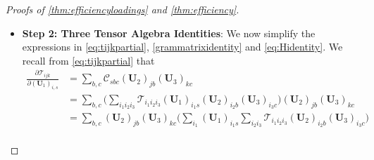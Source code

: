 \documentclass[10pt]{article}
\newcommand{\0}{{\mathbf{0}}}
\newcommand{\1}{{\mathbf{1}}}
\newcommand{\U}{{\mathbf{U}}}
\renewcommand{\t}{^{\top}}
\newcommand{\del}{\partial}
\begin{document}
\begin{proof}[Proofs of \cref{thm:efficiencyloadings} and \cref{thm:efficiency}]
\begin{itemize}
Define the $r_1$ vectors $\{\mathbf{c}_{a_i}\}_{i=1}^{r_1} \in \mathbb{R}^{r_2 r_3}$ by setting its $(b,c)$ entry equal to $\mathcal{C}_{a_i bc}$, and define the $r_2$ and $r_3$ vectors $\{\mathbf{c}_{b_j}\}_{j=1}^{r_2}$ and $\{ \mathbf{c}_{c_k}\}_{k=1}^{r_3}$ similarly.  With this definition, we note that \eqref{grammatrixidentity} is simply the equation for the sample gram matrix for the $r_1$ vectors $\{\mathbf{c}_{a_i}\}_{i=1}^{r_1} \in \mathbb{R}^{r_2 r_3}$ (with similar observations for the other two modes).  Therefore, abusing notation slightly, let $\mathbf{I}_1 \in \mathbb{R}^{p_1 r_1 \times p_1 r_1}$ be the block-diagonal matrix with $r_1 \times r_1$ blocks   given by this sample gram matrix, and let $\mathbf{I}_2$ and $\mathbf{I}_3$ be defined similarly.  With these notations in place, we see that $\mathcal{I}$ can be written in the following form:
\begin{align*}
   \sigma^2 \mathcal{I} &= \begin{pmatrix}
    \mathbf{I}_1 & 0 &0 \\ 0 & \mathbf{I}_2 & 0 \\
    0 & 0 &\mathbf{I}_3
    \end{pmatrix} + \begin{pmatrix} 0 & \mathbf{H}_{12} & \mathbf{H}_{13} \\ \mathbf{H}_{12}\t & 0 & \mathbf{H}_{23} \\ \mathbf{H}_{13}\t & \mathbf{H}_{23}\t & 0
    \end{pmatrix},
\end{align*}
where $\mathbf{H}_{12}, \mathbf{H}_{13}$ and $\mathbf{H}_{23}$ are of appropriate dimension with entries given by the identity in \eqref{eq:Hidentity}.  
\item 
\textbf{Step 2: Three Tensor Algebra Identities}: 
We now simplify the expressions in \eqref{eq:tijkpartial},
\eqref{grammatrixidentity} and \eqref{eq:Hidentity}.  
We recall from \eqref{eq:tijkpartial} that
\begin{align}
     \frac{\del \mathcal{T}_{ijk}}{\del (\U_1)_{i,s}} &= \sum_{b,c} \mathcal{C}_{sbc} (\U_2)_{jb} (\U_3)_{kc} \nonumber\\
     &= \sum_{b,c} \bigg( \sum_{i_1i_2i_3} \mathcal{T}_{i_1 i_2 i_3} (\U_1)_{i_1 s} (\U_2)_{i_2 b} (\U_3)_{i_3 c} \bigg) (\U_2)_{jb} (\U_3)_{kc} \nonumber\\
     &= \sum_{b,c} (\U_2)_{jb} (\U_3)_{kc} \bigg( \sum_{i_1} (\U_1)_{i_1 s} \sum_{i_2 i_3} \mathcal{T}_{i_1 i_2 i_3} (\U_2)_{i_2 b} (\U_3)_{i_3 c} \bigg)\nonumber \\

\end{align}
\end{itemize}
\end{proof}
\end{document}
